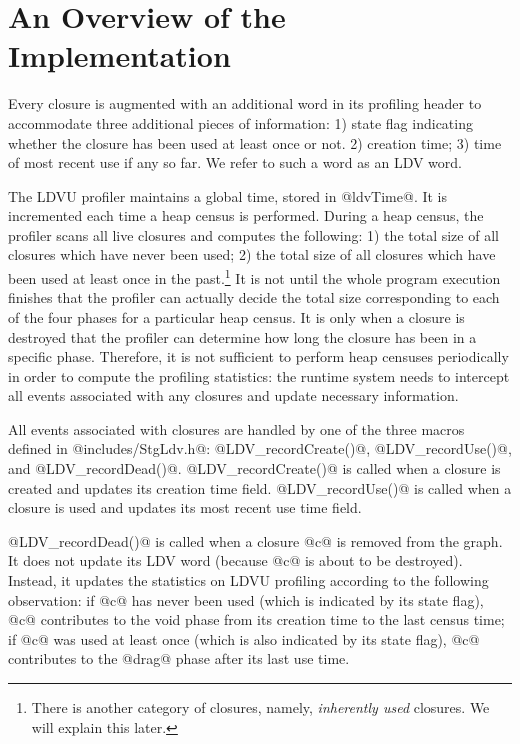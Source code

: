 \documentclass{article}
\begin{document}
\section{An Overview of the Implementation}

Every closure is augmented with an additional word in its profiling header
to accommodate three additional pieces of information: 
1) state flag indicating whether the closure has been used at least once or not.
2) creation time; 3) time of most recent use if any so far.
We refer to such a word as an LDV word.

The LDVU profiler maintains a global time, stored in @ldvTime@.
It is incremented each time a heap census is performed.
During a heap census, the profiler scans all live closures and computes the 
following: 
1) the total size of all closures which have never been used; 
2) the total size of all closures which have been used at least once 
in the past.\footnote{There is another category of closures, namely, 
\emph{inherently used} closures. We will explain this later.}
It is not until the whole program execution finishes that the profiler 
can actually decide the total size corresponding to each of the four phases for
a particular heap census. It is only when a closure is destroyed that the profiler
can determine how long the closure has been in a specific phase. 
Therefore, it is not sufficient to perform heap censuses periodically in order to
compute the profiling statistics: the runtime system needs to intercept
all events associated with any closures and update necessary information.

All events associated with closures are handled by one of the three 
macros defined
in @includes/StgLdv.h@: @LDV_recordCreate()@, @LDV_recordUse()@, and 
@LDV_recordDead()@.
@LDV_recordCreate()@ is called when a closure is created and updates its creation
time field.
@LDV_recordUse()@ is called when a closure is used and updates its most recent
use time field.

@LDV_recordDead()@ is called when a closure @c@ is removed from the graph.
It does not update its LDV word (because @c@ is about to be destroyed).
Instead, it updates the statistics on LDVU profiling according to the following
observation:
if @c@ has never been used (which is indicated by its state flag), 
@c@ contributes to the void phase from its creation time to the last census
time; if @c@ was used at least once (which is also indicated by its state flag), 
@c@ contributes to the @drag@ phase after its last use time. 
\end{document}
